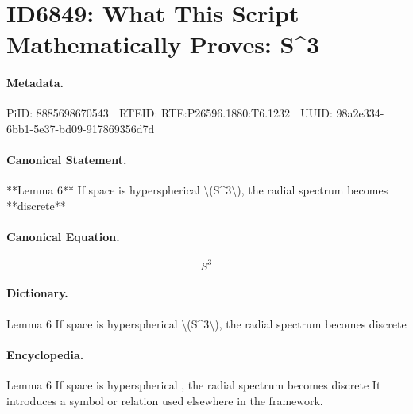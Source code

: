 \section*{ID6849: What This Script Mathematically Proves: S\textasciicircum{}3}
\paragraph{Metadata.}
PiID: 8885698670543 | RTEID: RTE:P26596.1880:T6.1232 | UUID: 98a2e334-6bb1-5e37-bd09-917869356d7d

\paragraph{Canonical Statement.}
**Lemma 6** If space is hyperspherical \textbackslash{}(S\textasciicircum{}3\textbackslash{}), the radial spectrum becomes **discrete**

\paragraph{Canonical Equation.}
\[
S^3
\]

\paragraph{Dictionary.}
Lemma 6 If space is hyperspherical \textbackslash{}(S\textasciicircum{}3\textbackslash{}), the radial spectrum becomes discrete

\paragraph{Encyclopedia.}
Lemma 6 If space is hyperspherical , the radial spectrum becomes discrete It introduces a symbol or relation used elsewhere in the framework.
